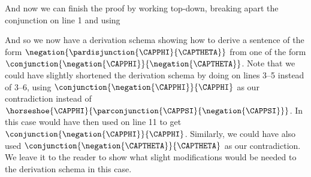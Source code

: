 And now we can finish the proof by working top-down, breaking apart the conjunction on line 1 and using 
\begin{gproof}[\label{DeMDerivationSchema}]
\end{gproof}
And so we now have a derivation schema showing how to derive a sentence of the form $\negation{\pardisjunction{\CAPPHI}{\CAPTHETA}}$ from one of the form $\conjunction{\negation{\CAPPHI}}{\negation{\CAPTHETA}}$. Note that we could have slightly shortened the derivation schema by doing  on lines 3--5 instead of 3--6, using $\conjunction{\negation{\CAPPHI}}{\CAPPHI}$ as our contradiction instead of $\horseshoe{\CAPPHI}{\parconjunction{\CAPPSI}{\negation{\CAPPSI}}}$. In this case would have then used  on line 11 to get $\conjunction{\negation{\CAPPHI}}{\CAPPHI}$. Similarly, we could have also used $\conjunction{\negation{\CAPTHETA}}{\CAPTHETA}$ as our contradiction. We leave it to the reader to show what slight modifications would be needed to the derivation schema in this case. 

